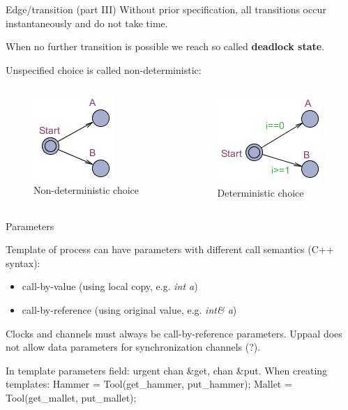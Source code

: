 \documentclass{beamer}
\begin{document}
\begin{frame}{Edge/transition (part III)}
	Without prior specification, all transitions occur instantaneously and do not take time.\newline
	
	When no further transition is possible we reach so called \textbf{deadlock state}.\newline
	
	Unspecified choice is called non-deterministic:\newline
	\vspace{-8mm}
	\begin{columns}
		\begin{column}{.5\textwidth}
			\begin{figure}[H]
				\label{img:ndc}
				\includegraphics[scale=0.7]{img/uppaal_non_deterministic_choice.png}
				\caption{Non-deterministic choice}
			\end{figure}
		\end{column}
		\begin{column}{.5\textwidth}
			\begin{figure}[H]
				\label{img:dc}
				\includegraphics[scale=0.7]{img/uppaal_deterministic_choice.png}
				\caption{Deterministic choice}
			\end{figure}
		\end{column}		
	\end{columns}
\end{frame}

\begin{frame}{Parameters}
	
	Template of process can have parameters with different call semantics (C++ syntax):
	
	\begin{itemize}
		\item call-by-value (using local copy, e.g. \textit{int a})
		\item call-by-reference (using original value, e.g. \textit{int\& a})
	\end{itemize}
	
	Clocks and channels must always be call-by-reference parameters.
	Uppaal does not allow data parameters for synchronization channels (?).
	
	In template parameters field: urgent chan \&get, chan \&put.
	When creating templates:
	Hammer = Tool(get\_hammer, put\_hammer);
	Mallet = Tool(get\_mallet, put\_mallet);
\end{frame}
\end{document}
